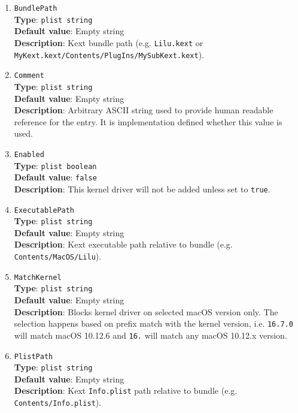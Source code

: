 \documentclass[]{article}
\begin{document}
\begin{enumerate}
\item
  \texttt{BundlePath}\\
  \textbf{Type}: \texttt{plist\ string}\\
  \textbf{Default value}: Empty string\\
  \textbf{Description}: Kext bundle path (e.g. \texttt{Lilu.kext}
  or \texttt{MyKext.kext/Contents/PlugIns/MySubKext.kext}).

\item
  \texttt{Comment}\\
  \textbf{Type}: \texttt{plist\ string}\\
  \textbf{Default value}: Empty string\\
  \textbf{Description}: Arbitrary ASCII string used to provide human readable
  reference for the entry. It is implementation defined whether this value is
  used.

\item
  \texttt{Enabled}\\
  \textbf{Type}: \texttt{plist\ boolean}\\
  \textbf{Default value}: \texttt{false}\\
  \textbf{Description}: This kernel driver will not be added unless set to
  \texttt{true}.

\item
  \texttt{ExecutablePath}\\
  \textbf{Type}: \texttt{plist\ string}\\
  \textbf{Default value}: Empty string\\
  \textbf{Description}: Kext executable path relative to bundle
  (e.g. \texttt{Contents/MacOS/Lilu}).

\item
  \texttt{MatchKernel}\\
  \textbf{Type}: \texttt{plist\ string}\\
  \textbf{Default value}: Empty string\\
  \textbf{Description}: Blocks kernel driver on selected macOS version only.
  The selection happens based on prefix match with the kernel version, i.e.
  \texttt{16.7.0} will match macOS 10.12.6 and \texttt{16.} will match
  any macOS 10.12.x version.

\item
  \texttt{PlistPath}\\
  \textbf{Type}: \texttt{plist\ string}\\
  \textbf{Default value}: Empty string\\
  \textbf{Description}: Kext \texttt{Info.plist} path relative to bundle
  (e.g. \texttt{Contents/Info.plist}).

\end{enumerate}
\end{document}
